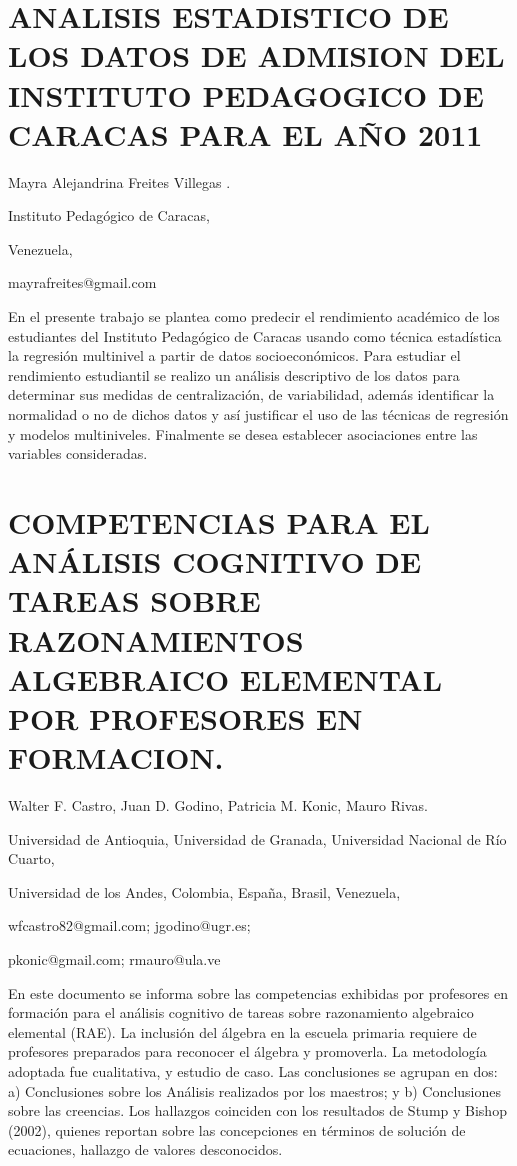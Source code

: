 \section{ANALISIS ESTADISTICO DE LOS DATOS DE ADMISION DEL INSTITUTO PEDAGOGICO
DE CARACAS PARA EL AÑO 2011}

\begin{datos}

Mayra Alejandrina Freites Villegas .

Instituto Pedagógico de Caracas,

Venezuela,

mayrafreites@gmail.com

\end{datos}

En el presente trabajo se plantea como predecir el rendimiento académico
de los estudiantes del Instituto Pedagógico de Caracas usando como
técnica estadística la regresión multinivel a partir de datos socioeconómicos.
Para estudiar el rendimiento estudiantil se realizo un análisis descriptivo
de los datos para determinar sus medidas de centralización, de variabilidad,
además identificar la normalidad o no de dichos datos y así justificar
el uso de las técnicas de regresión y modelos multiniveles. Finalmente
se desea establecer asociaciones entre las variables consideradas.


\section{COMPETENCIAS PARA EL ANÁLISIS COGNITIVO DE TAREAS SOBRE RAZONAMIENTOS
ALGEBRAICO ELEMENTAL POR PROFESORES EN FORMACION. }

\begin{datos}

Walter F. Castro, Juan D. Godino, Patricia M. Konic, Mauro Rivas. 

Universidad de Antioquia, Universidad de Granada, Universidad Nacional
de Río Cuarto,

Universidad de los Andes, Colombia, España, Brasil, Venezuela,

wfcastro82@gmail.com; jgodino@ugr.es;

pkonic@gmail.com; rmauro@ula.ve

\end{datos}

En este documento se informa sobre las competencias exhibidas por
profesores en formación para el análisis cognitivo de tareas sobre
razonamiento algebraico elemental (RAE). La inclusión del álgebra
en la escuela primaria requiere de profesores preparados para reconocer
el álgebra y promoverla. La metodología adoptada fue cualitativa,
y estudio de caso. Las conclusiones se agrupan en dos: a) Conclusiones
sobre los Análisis realizados por los maestros; y b) Conclusiones
sobre las creencias. Los hallazgos coinciden con los resultados de
Stump y Bishop (2002), quienes reportan sobre las concepciones en
términos de solución de ecuaciones, hallazgo de valores desconocidos.


